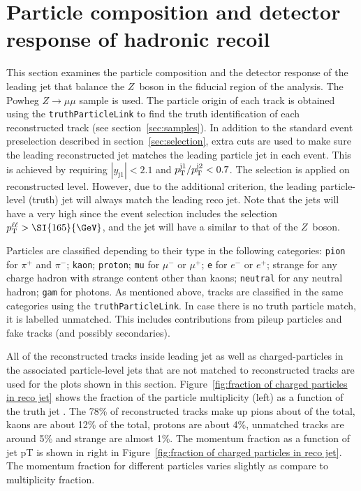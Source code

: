 \section{Particle composition and detector response of hadronic recoil}

This section examines the particle composition and the detector response of the leading jet that balance the $Z$~boson in the fiducial region of the analysis. 
The Powheg $Z\to \mu\mu$ sample is used. The particle origin of each track is obtained using the \texttt{truthParticleLink} to find the truth identification of each reconstructed track (see section~\ref{sec:samples}). In addition to the standard event preselection described in section~\ref{sec:selection}, extra cuts are used to make sure the leading reconstructed jet matches the leading particle jet in each event. 
This is achieved by requiring $|y_\mathrm{j1}|<2.1$ and $p_\mathrm{T}^{\mathrm{j1}} / p_\mathrm{T}^{\mathrm{j2}} < 0.7$. The selection is applied on reconstructed level. However, due to the additional criterion, the leading particle-level (truth) jet will always match the leading reco jet. Note that the jets will have a very high \pt{} since the event selection includes the selection $\pTll > \SI{165}{\GeV}$, and the jet will have a similar \pt{} to that of the $Z$~boson.

Particles are classified depending to their type in the following categories: \texttt{pion} for $\pi^+$ and $\pi^-$; \texttt{kaon}; \texttt{proton}; 
\texttt{mu} for $\mu^-$ or $\mu^+$; \texttt{e} for $e^-$ or $e^+$;
strange for any charge hadron with strange content other than kaons; \texttt{neutral} for any neutral hadron; \texttt{gam} for photons. As mentioned above, tracks are classified in the same categories using the \texttt{truthParticleLink}. In case there is no truth particle match, it is labelled unmatched. This includes contributions from pileup particles and fake tracks (and possibly secondaries).


All of the reconstructed tracks inside leading jet as well as charged-particles in the associated particle-level jets that are not matched to reconstructed tracks are used for the plots shown in this section. Figure~\ref{fig:fraction of charged particles in reco jet} shows the fraction of the particle multiplicity (left) as a function of the truth jet \pT. The 78\% of reconstructed tracks make up pions about of the total, kaons are about 12\% of the total, protons are about 4\%, unmatched tracks are around 5\% and strange are almost 1\%. The momentum fraction as a function of jet pT is shown in right in Figure~\ref{fig:fraction of charged particles in reco jet}. The momentum fraction for different particles varies slightly as compare to multiplicity fraction.

